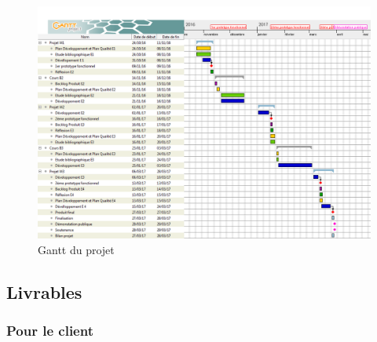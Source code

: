 \documentclass[10pt,a4paper]{article}
\begin{document}
\begin{figure}
  \centering
\noindent\includegraphics[width=\textwidth]{general.png} 
  \caption{Gantt du projet}
\end{figure}

\subsection{Livrables}

\subsubsection{Pour le client}
\end{document}

